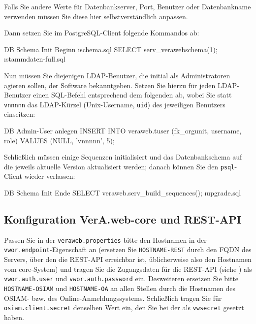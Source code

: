 Falls Sie andere Werte für Datenbankserver, Port, Benutzer oder Datenbankname
verwenden müssen Sie diese hier selbstverständlich anpassen.

\begin{minipage}{\textwidth}
Dann setzen Sie im PostgreSQL-Client folgende Kommandos ab:

\begin{lstdump}{DB Schema Init Beginn}
\i schema.sql
SELECT serv_verawebschema(1);
\i stammdaten-full.sql
\end{lstdump}
\end{minipage}

\begin{minipage}{\textwidth}
Nun müssen Sie diejenigen LDAP-Benutzer, die initial als Administratoren
agieren sollen, der Software bekanntgeben. Setzen Sie hierzu für jeden
LDAP-Benutzer einen SQL-Befehl entsprechend dem folgenden ab, wobei Sie
statt \texttt{vnnnnn} das LDAP-Kürzel (Unix-Username, \texttt{uid}) des
jeweiligen Benutzers einseitzen:

\begin{lstdump}[language=SQL]{DB Admin-User anlegen}
INSERT INTO veraweb.tuser (fk_orgunit, username, role)
    VALUES (NULL, 'vnnnnn', 5);
\end{lstdump}\label{manual:db-user}
\end{minipage}

\begin{minipage}{\textwidth}
Schließlich müssen einige Sequenzen initialisiert und das Datenbankschema
auf die jeweils aktuelle Version aktualisiert werden; danach können Sie
den \texttt{psql}-Client wieder verlassen:

\begin{lstdump}{DB Schema Init Ende}
SELECT veraweb.serv_build_sequences();
\i upgrade.sql
\q
\end{lstdump}
\end{minipage}

\subsection{Konfiguration VerA.web-core und REST-API}\label{subsec:setup-core-files}

Passen Sie in der \texttt{veraweb.properties} bitte den Hostnamen
in der \texttt{vwor.endpoint}-Eigenschaft an (ersetzen Sie
\texttt{HOSTNAME-REST} durch den FQDN des Servers, über den die
REST-API erreichbar ist, üblicherweise also den Hostnamen vom
core-System) und tragen Sie die Zugangsdaten für die REST-API
(siehe ) als \texttt{vwor.auth.user}
und \texttt{vwor.auth.password} ein.
\ifoa
Desweiteren ersetzen Sie bitte \texttt{HOSTNAME-OSIAM} und
\texttt{HOSTNAME-OA} an allen Stellen durch die Hostnamen
des OSIAM- bzw. des Online-Anmeldungssystems. Schließlich
tragen Sie für \texttt{osiam.client.secret} denselben Wert
ein, den Sie bei der 
als \texttt{vwsecret} gesetzt haben.
\fi%

